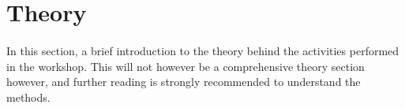 \section{Theory}
    \paragraph{}
    In this section, a brief introduction to the theory behind the activities performed in the workshop. This will not however be a comprehensive theory section however, and further reading is strongly recommended to understand the methods.







